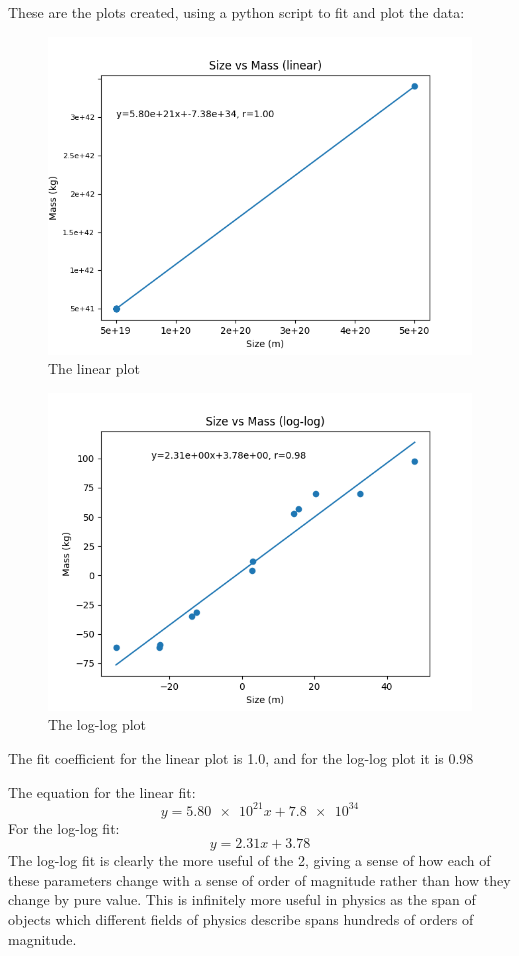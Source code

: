 \documentclass[12pt]{article}
\begin{document}
These are the plots created, using a python script to fit and plot the data:
\begin{figure}[H]
  \centering
  \includegraphics[width=12.0cm]{linear}
  \caption{The linear plot}
  \label{fig:1}
\end{figure}
\begin{figure}[H]
  \centering
  \includegraphics[width=12.0cm]{loglog}
  \caption{The log-log plot}
  \label{fig:2}
\end{figure}
The fit coefficient for the linear plot is 1.0, and for the log-log plot it is 0.98

The equation for the linear fit:
\begin{equation*}
  y = \num{5.80e21}x+\num{7.8e34}
\end{equation*}
For the log-log fit:
\begin{equation*}
  y = 2.31x+3.78
\end{equation*}
The log-log fit is clearly the more useful of the 2, giving a sense of how each of these parameters change with a sense of order of magnitude rather than how they change by pure value. This is infinitely more useful in physics as the span of objects which different fields of physics describe spans hundreds of orders of magnitude.
\end{document}
